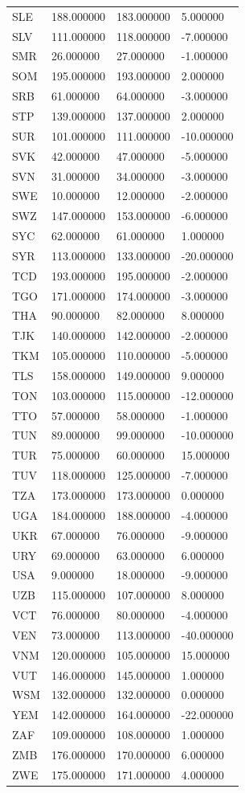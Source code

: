\begin{tabular}{llll}
SLE & 188.000000 & 183.000000 & 5.000000 \\
SLV & 111.000000 & 118.000000 & -7.000000 \\
SMR & 26.000000 & 27.000000 & -1.000000 \\
SOM & 195.000000 & 193.000000 & 2.000000 \\
SRB & 61.000000 & 64.000000 & -3.000000 \\
STP & 139.000000 & 137.000000 & 2.000000 \\
SUR & 101.000000 & 111.000000 & -10.000000 \\
SVK & 42.000000 & 47.000000 & -5.000000 \\
SVN & 31.000000 & 34.000000 & -3.000000 \\
SWE & 10.000000 & 12.000000 & -2.000000 \\
SWZ & 147.000000 & 153.000000 & -6.000000 \\
SYC & 62.000000 & 61.000000 & 1.000000 \\
SYR & 113.000000 & 133.000000 & -20.000000 \\
TCD & 193.000000 & 195.000000 & -2.000000 \\
TGO & 171.000000 & 174.000000 & -3.000000 \\
THA & 90.000000 & 82.000000 & 8.000000 \\
TJK & 140.000000 & 142.000000 & -2.000000 \\
TKM & 105.000000 & 110.000000 & -5.000000 \\
TLS & 158.000000 & 149.000000 & 9.000000 \\
TON & 103.000000 & 115.000000 & -12.000000 \\
TTO & 57.000000 & 58.000000 & -1.000000 \\
TUN & 89.000000 & 99.000000 & -10.000000 \\
TUR & 75.000000 & 60.000000 & 15.000000 \\
TUV & 118.000000 & 125.000000 & -7.000000 \\
TZA & 173.000000 & 173.000000 & 0.000000 \\
UGA & 184.000000 & 188.000000 & -4.000000 \\
UKR & 67.000000 & 76.000000 & -9.000000 \\
URY & 69.000000 & 63.000000 & 6.000000 \\
USA & 9.000000 & 18.000000 & -9.000000 \\
UZB & 115.000000 & 107.000000 & 8.000000 \\
VCT & 76.000000 & 80.000000 & -4.000000 \\
VEN & 73.000000 & 113.000000 & -40.000000 \\
VNM & 120.000000 & 105.000000 & 15.000000 \\
VUT & 146.000000 & 145.000000 & 1.000000 \\
WSM & 132.000000 & 132.000000 & 0.000000 \\
YEM & 142.000000 & 164.000000 & -22.000000 \\
ZAF & 109.000000 & 108.000000 & 1.000000 \\
ZMB & 176.000000 & 170.000000 & 6.000000 \\
ZWE & 175.000000 & 171.000000 & 4.000000 \\
\hline
\end{tabular}
